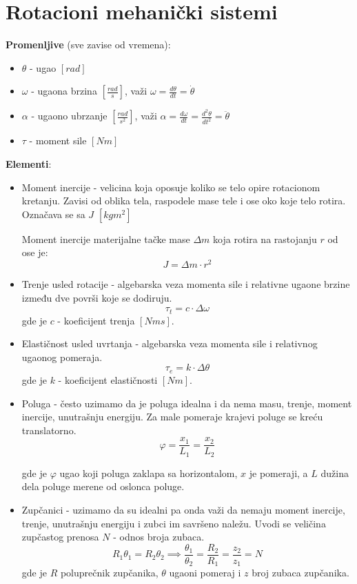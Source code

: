 \documentclass[10pt]{report}
\begin{document}
	\section*{Rotacioni mehanički sistemi}

		\textbf{Promenljive} (sve zavise od vremena):
		\begin{itemize}
			\item $\theta$ - ugao $[rad]$
			\item $\omega$ - ugaona brzina $[\frac{rad}{s}]$, važi $\omega=\frac{d\theta}{dt}=\dot{\theta}$
			\item $\alpha$ - ugaono ubrzanje $[\frac{rad}{s^2}]$, važi $\alpha=\frac{d\omega}{dt}=\frac{d^2\theta}{dt^2}=\ddot{\theta}$
			\item $\tau$ - moment sile $[Nm]$
		\end{itemize}

		\textbf{Elementi}:
		\begin{itemize}
			\item Moment inercije - velicina koja oposuje koliko se telo opire rotacionom kretanju. Zavisi od oblika tela,
			raspodele mase tele i ose oko koje telo rotira. Označava se sa $J$ $[kg m^2]$

			Moment inercije materijalne tačke mase $\Delta m$ koja rotira na rastojanju $r$ od ose je:
			$$J = \Delta m \cdot r^2$$

			\item Trenje usled rotacije - algebarska veza momenta sile i relativne ugaone brzine
			između dve površi koje se dodiruju.
				$$\tau_t = c \cdot \Delta\omega$$
			gde je $c$ - koeficijent trenja $[Nms]$.

			\item Elastičnost usled uvrtanja - algebarska veza momenta sile i relativnog ugaonog pomeraja.
				$$\tau_e = k \cdot \Delta\theta$$
			gde je $k$ - koeficijent elastičnosti $[Nm]$.

			\item Poluga - često uzimamo da je poluga idealna i da nema masu, trenje, moment inercije, unutrašnju energiju.
			Za male pomeraje krajevi poluge se kreću translatorno.
				$$\varphi = \frac{x_1}{L_1} = \frac{x_2}{L_2}$$

			gde je $\varphi$ ugao koji poluga zaklapa sa horizontalom, $x$ je pomeraji, a $L$ dužina dela poluge merene od oslonca poluge.

			\item Zupčanici - uzimamo da su idealni pa onda važi da nemaju moment inercije, trenje, unutrašnju energiju i zubci im savršeno naležu.
			Uvodi se veličina zupčastog prenosa $N$ - odnos broja zubaca.
				$$R_1\theta_1 = R_2\theta_2 \implies \frac{\theta_1}{\theta_2} = \frac{R_2}{R_1} = \frac{z_2}{z_1} = N$$
			gde je $R$ poluprečnik zupčanika, $\theta$ ugaoni pomeraj i $z$ broj zubaca zupčanika.

		\end{itemize}
\end{document}
